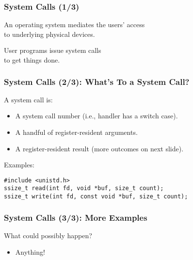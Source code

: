 \begin{frame}

\frametitle{System Calls (1/3)}

\vspace{\fill}

\begin{center}

An operating system mediates the users' access \\ to underlying physical
devices.

\end{center}

\begin{center}

User programs issue system calls \\ to get things done.

\end{center}

\vspace{\fill}

\end{frame}


\begin{frame}[fragile]

\frametitle{System Calls (2/3): What's To a System Call?}

\vspace{\fill}

A system call is:

\begin{itemize}

\item A system call number (i.e., handler has a switch case).

\item A handful of register-resident arguments.

\item A register-resident result (more outcomes on next slide).

\end{itemize}

Examples:

\begin{lstlisting}
#include <unistd.h>
ssize_t read(int fd, void *buf, size_t count);
ssize_t write(int fd, const void *buf, size_t count);
\end{lstlisting}

\vspace{\fill}

\end{frame}


\begin{frame}

\frametitle{System Calls (3/3): More Examples}

\vspace{\fill}

What could possibly happen?

\begin{itemize}

\item Anything!

\end{itemize}

\vspace{\fill}

\end{frame}
